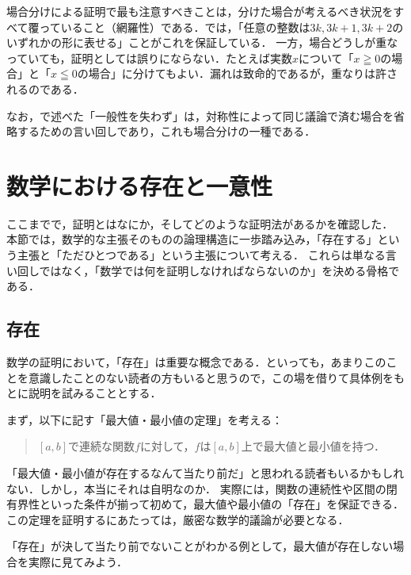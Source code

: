 \begin{remark}[場合分けの網羅性]
  場合分けによる証明で最も注意すべきことは，分けた場合が考えるべき状況をすべて覆っていること（網羅性）である．では，「任意の整数は$3k,3k+1,3k+2$のいずれかの形に表せる」ことがこれを保証している．
  一方，場合どうしが重なっていても，証明としては誤りにならない．たとえば実数$x$について「$x \geqq 0$の場合」と「$x \leqq 0$の場合」に分けてもよい．漏れは致命的であるが，重なりは許されるのである．

  なお，で述べた「一般性を失わず」は，対称性によって同じ議論で済む場合を省略するための言い回しであり，これも場合分けの一種である．
\end{remark}

\section{数学における存在と一意性}

ここまでで，証明とはなにか，そしてどのような証明法があるかを確認した．
本節では，数学的な主張そのものの論理構造に一歩踏み込み，「存在する」という主張と「ただひとつである」という主張について考える．
これらは単なる言い回しではなく，「数学では何を証明しなければならないのか」を決める骨格である．

\subsection{存在}

数学の証明において，「存在」は重要な概念である．といっても，あまりこのことを意識したことのない読者の方もいると思うので，この場を借りて具体例をもとに説明を試みることとする．

まず，以下に記す「最大値・最小値の定理」を考える：
\begin{quotation}
  $[a,b]$で連続な関数$f$に対して，$f$は$[a,b]$上で最大値と最小値を持つ．
\end{quotation}

「最大値・最小値が存在するなんて当たり前だ」と思われる読者もいるかもしれない．しかし，本当にそれは自明なのか．
実際には，関数の連続性や区間の閉有界性といった条件が揃って初めて，最大値や最小値の「存在」を保証できる．この定理を証明するにあたっては，厳密な数学的議論が必要となる．

「存在」が決して当たり前でないことがわかる例として，最大値が存在しない場合を実際に見てみよう．

